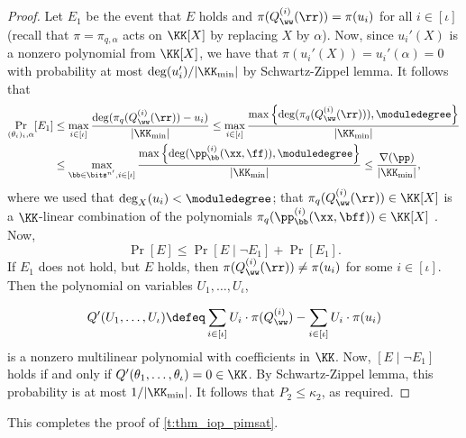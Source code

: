 \begin{proof}
Let $E_1$ be the event that  $E$ holds and
%
$\pi(Q_{\ww}^{(i)}(\rr)) =\pi(u_i)$ for all $i\in [\iota]$ (recall that $\pi=\pi_{q,\alpha}$ acts on $\KK[X]$ by replacing $X$ by $\alpha$).  Now, since $u_i'(X)$ is a nonzero polynomial from $\KK[X]$, we have that $\pi(u_i'(X)) = u_i'(\alpha) =0$ with probability at most $\deg(u_i')/|\KK_{\min}|$ by Schwartz-Zippel lemma. It follows that 
%
%
\begin{align*}
\Pr_{(\theta_i)_i, \alpha}[E_1] &\leq \max_{i\in [\iota]} \frac{\deg(\pi_q(Q_{\ww}^{(i)}(\rr)) - u_i)}{|\KK_{\min}|}\leq  \max_{i\in [\iota]} \frac{\max\left\{\deg(\pi_q(Q_{\ww}^{(i)}(\rr))),\moduledegree\right\}}{|\KK_{\min}|}\\ &\leq  \max_{\bb\in \bits^{n'},i\in [\iota]} \frac{\max\left\{\deg(\pp_\bb^{(i)}(\xx,\ff)),\moduledegree\right\}}{|\KK_{\min}|} \leq  \frac{\nabla(\pp)}{|\KK_{\min}|},
\end{align*}
%
where we used that $\deg_X(u_i)< \moduledegree$; that $\pi_q(Q_{\ww}^{(i)}(\rr))\in \KK[X]$ is a $\KK$-linear combination of the polynomials $\pi_q(\pp_{\bb}^{(i)}(\xx,\bff)) \in \KK[X]$ . 
%
Now,
$$
\Pr[E]\leq \Pr[E\mid \neg E_1] + \Pr[E_1].
$$
%
If $E_1$ does not hold, but $E$ holds, then $\pi(Q_{\ww}^{(i)}(\rr)) \neq \pi(u_i)$ for some $i\in [\iota]$. Then the polynomial  on variables $U_1,\ldots, U_\iota$,

%
$$
Q'(U_1,\ldots, U_\iota)\defeq \sum_{i\in[\iota]} U_i \cdot \pi(Q_{\ww}^{(i)}) - \sum_{i\in [\iota]}U_i \cdot \pi(u_i)
$$
%
is a nonzero multilinear polynomial with coefficients in $\KK$. Now, $[E\mid \neg E_1]$ holds if and only if $Q'(\theta_1, \ldots, \theta_\iota)=0\in \KK$. By Schwartz-Zippel lemma, this probability is at most $1/|\KK_{\min}|$.  It follows that $P_2\leq \kappa_2$, as required. 
%
\end{proof}
This completes the proof of \cref{t:thm_iop_pimsat}.




